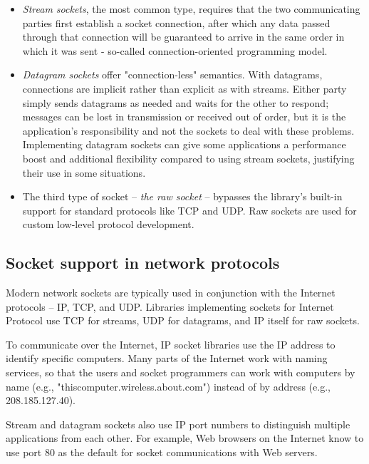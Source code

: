 \documentclass[a4paper,12pt]{article}
\begin{document}
\begin{itemize}
    \item \textit{Stream sockets}, the most common type, requires that the two communicating parties first establish a socket connection, after which any data passed through that connection will be guaranteed to arrive in the same order in which it was sent - so-called connection-oriented programming model.
    \item \textit{Datagram sockets} offer "connection-less" semantics. With datagrams, connections are implicit rather than explicit as with streams. Either party simply sends datagrams as needed and waits for the other to respond; messages can be lost in transmission or received out of order, but it is the application's responsibility and not the sockets to deal with these problems. Implementing datagram sockets can give some applications a performance boost and additional flexibility compared to using stream sockets, justifying their use in some situations.
    \item The third type of socket -- \textit{the raw socket} -- bypasses the library's built-in support for standard protocols like TCP and UDP. Raw sockets are used for custom low-level protocol development.
\end{itemize}

\subsection{Socket support in network protocols}
Modern network sockets are typically used in conjunction with the Internet protocols -- IP, TCP, and UDP. Libraries implementing sockets for Internet Protocol use TCP for streams, UDP for datagrams, and IP itself for raw sockets.


To communicate over the Internet, IP socket libraries use the IP address to identify specific computers. Many parts of the Internet work with naming services, so that the users and socket programmers can work with computers by name (e.g., "thiscomputer.wireless.about.com") instead of by address (e.g., 208.185.127.40).


Stream and datagram sockets also use IP port numbers to distinguish multiple applications from each other. For example, Web browsers on the Internet know to use port 80 as the default for socket communications with Web servers.
\end{document}

